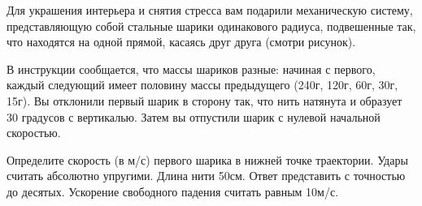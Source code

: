 
Для украшения интерьера и снятия стресса вам подарили механическую систему, 
представляющую собой стальные шарики одинакового радиуса, подвешенные так, что 
находятся на одной прямой, касаясь друг друга (смотри рисунок).


В инструкции сообщается, что массы шариков разные: начиная с первого, каждый следующий имеет 
половину массы предыдущего (240г, 120г, 60г, 30г, 15г). Вы отклонили первый шарик в сторону так, 
что нить натянута и образует 30 градусов с вертикалью. Затем вы отпустили шарик с 
нулевой начальной скоростью.

Определите скорость (в м/с) первого шарика в нижней точке траектории. Удары считать абсолютно упругими. 
Длина нити 50см. Ответ представить с точностью до десятых. Ускорение свободного падения считать равным 10м/с.


